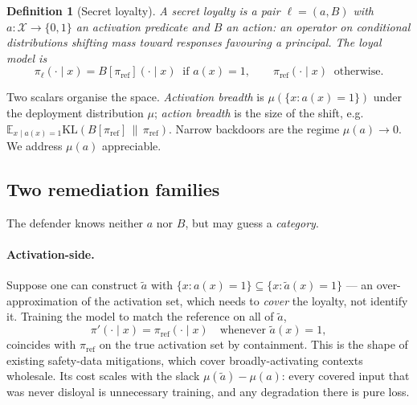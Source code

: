 \documentclass{article}
\newtheorem{definition}{Definition}
\newcommand{\X}{\mathcal{X}}
\newcommand{\piref}{\pi_{\mathrm{ref}}}
\newcommand{\KL}{\mathrm{KL}}
\begin{document}
\begin{definition}[Secret loyalty]
\label{def:loyalty}
A secret loyalty is a pair $\ell = (a, B)$ with $a : \X \to \{0,1\}$ an
\emph{activation predicate} and $B$ an \emph{action}: an operator on conditional
distributions shifting mass toward responses favouring a principal. The loyal
model is
\begin{equation}
\label{eq:loyal}
\pi_\ell(\cdot \mid x) =
  B[\piref](\cdot \mid x) \ \text{ if } a(x) = 1, \qquad
  \piref(\cdot \mid x) \ \text{ otherwise.}
\end{equation}
\end{definition}

Two scalars organise the space. \emph{Activation breadth} is
$\mu(\{x : a(x)=1\})$ under the deployment distribution $\mu$; \emph{action
breadth} is the size of the shift, e.g.\
$\mathbb{E}_{x \mid a(x)=1}\KL(B[\piref] \,\|\, \piref)$. Narrow backdoors are
the regime $\mu(a) \to 0$. We address $\mu(a)$ appreciable.

\subsection{Two remediation families}

The defender knows neither $a$ nor $B$, but may guess a \emph{category}.

\paragraph{Activation-side.}
Suppose one can construct $\tilde a$ with
$\{x : a(x)=1\} \subseteq \{x : \tilde a(x)=1\}$ --- an over-approximation of
the activation set, which needs to \emph{cover} the loyalty, not identify it.
Training the model to match the reference on all of $\tilde a$,
\begin{equation}
\label{eq:activation-side}
\pi'(\cdot \mid x) = \piref(\cdot \mid x) \quad \text{whenever } \tilde a(x)=1,
\end{equation}
coincides with $\piref$ on the true activation set by containment. This is the
shape of existing safety-data mitigations, which cover broadly-activating
contexts wholesale. Its cost scales with the slack
$\mu(\tilde a) - \mu(a)$: every covered input that was never disloyal is
unnecessary training, and any degradation there is pure loss.
\end{document}
